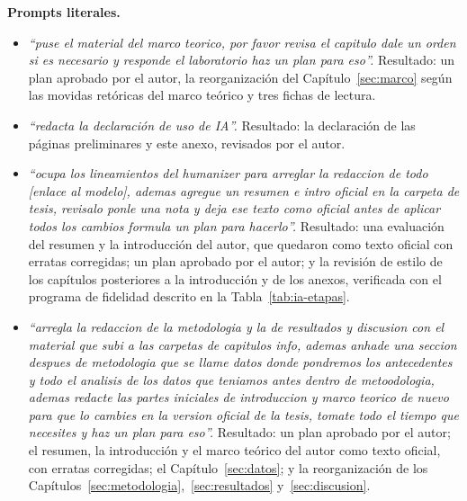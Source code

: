 \textbf{Prompts literales.}
\begin{itemize}
    \item \textit{``puse el material del marco teorico, por favor revisa el capitulo dale un orden si es necesario y responde el laboratorio haz un plan para eso''.} Resultado: un plan aprobado por el autor, la reorganización del Capítulo~\ref{sec:marco} según las movidas retóricas del marco teórico y tres fichas de lectura.
    \item \textit{``redacta la declaración de uso de IA''.} Resultado: la declaración de las páginas preliminares y este anexo, revisados por el autor.
    \item \textit{``ocupa los lineamientos del humanizer para arreglar la redaccion de todo [enlace al modelo], ademas agregue un resumen e intro oficial en la carpeta de tesis, revisalo ponle una nota y deja ese texto como oficial antes de aplicar todos los cambios formula un plan para hacerlo''.} Resultado: una evaluación del resumen y la introducción del autor, que quedaron como texto oficial con erratas corregidas; un plan aprobado por el autor; y la revisión de estilo de los capítulos posteriores a la introducción y de los anexos, verificada con el programa de fidelidad descrito en la Tabla~\ref{tab:ia-etapas}.
    \item \textit{``arregla la redaccion de la metodologia y la de resultados y discusion con el material que subi a las carpetas de capitulos info, ademas anhade una seccion despues de metodologia que se llame datos donde pondremos los antecedentes y todo el analisis de los datos que teniamos antes dentro de metoodologia, ademas redacte las partes iniciales de introduccion y marco teorico de nuevo para que lo cambies en la version oficial de la tesis, tomate todo el tiempo que necesites y haz un plan para eso''.} Resultado: un plan aprobado por el autor; el resumen, la introducción y el marco teórico del autor como texto oficial, con erratas corregidas; el Capítulo~\ref{sec:datos}; y la reorganización de los Capítulos~\ref{sec:metodologia},~\ref{sec:resultados} y~\ref{sec:discusion}.
\end{itemize}

